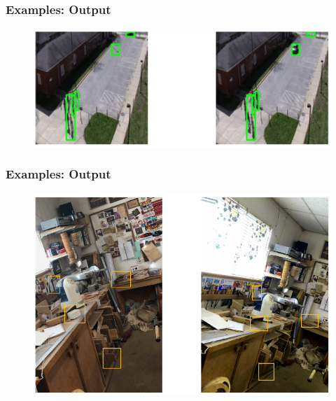 \documentclass[13.5pt,aspecratio=169, xcolor=dvipsnames]{beamer}
\begin{document}
            \begin{frame}
                \onehalfspacing
                    \frametitle{Examples: Output}
                    \begin{figure}[h]
                    \centering
                    \includegraphics[scale=0.4]{Example/Camera_1_bb.png}
                    \end{figure}
                \end{frame}
        
                \begin{frame}
                    \onehalfspacing
                        \frametitle{Examples: Output}
                        \begin{figure}[h]
                        \centering
                        \includegraphics[scale=0.5]{Example/Example_1_bb.png}
                        \end{figure}
                    \end{frame}
            
\end{document}
